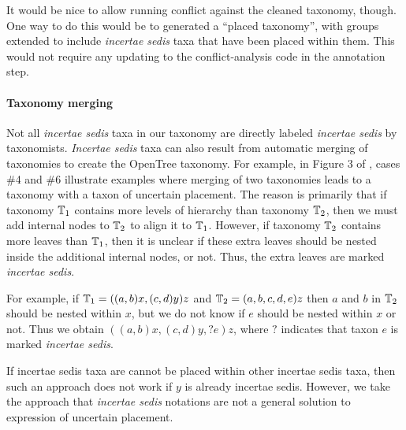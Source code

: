 \documentclass[english]{article}
\begin{document}
It would be nice to allow running conflict against the cleaned
taxonomy, though.
One way to do this would be to generated a ``placed
taxonomy'', with groups extended to include \emph{incertae sedis} taxa
that have been placed within them.
This would not require any updating
to the conflict-analysis code in the annotation step.


\paragraph{Taxonomy merging}

Not all \emph{incertae sedis} taxa in our taxonomy are directly
labeled \emph{incertae sedis} by taxonomists.
\emph{Incertae sedis}
taxa can also result from automatic merging of taxonomies to create
the OpenTree taxonomy.
For example, in Figure 3 of
\citet{rees2017automated}, cases \#4 and \#6 illustrate examples where
merging of two taxonomies leads to a taxonomy with a taxon of
uncertain placement.
The reason is primarily that if taxonomy
$\mbox{\ensuremath{\mathbb{T}}}_{1}$ contains more levels of hierarchy than taxonomy
$\mbox{\ensuremath{\mathbb{T}}}_{2}$, then we must add internal nodes to $\mbox{\ensuremath{\mathbb{T}}}_{2}$ to
align it to $\mbox{\ensuremath{\mathbb{T}}}_{1}$.
However, if taxonomy $\mbox{\ensuremath{\mathbb{T}}}_{2}$
contains more leaves than $\mbox{\ensuremath{\mathbb{T}}}_{1}$, then it is unclear if these
extra leaves should be nested inside the additional internal nodes, or
not.
Thus, the extra leaves are marked \emph{incertae sedis}.

For example, if $\mbox{\ensuremath{\mathbb{T}}}_{1}=((a,b)x,(c,d)y)z$ and
$\mbox{\ensuremath{\mathbb{T}}}_{2}=(a,b,c,d,e)z$ then $a$ and $b$ in $\mbox{\ensuremath{\mathbb{T}}}_{2}$
should be nested within $x$, but we do not know if $e$ should be
nested within $x$ or not.
Thus we obtain $((a,b)x,(c,d)y,?e)z$, where
$?$ indicates that taxon $e$ is marked \emph{incertae sedis}.

If incertae sedis taxa are cannot be placed within other incertae
sedis taxa, then such an approach does not work if $y$ is already
incertae sedis.
However, we take the approach that \emph{incertae
sedis} notations are not a general solution to expression of uncertain
placement.





\end{document}
